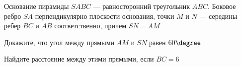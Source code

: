 \begin{ex}
	\begin{condition}
		Основание пирамиды \( SABC \) --- равносторонний треугольник \( ABC \). Боковое ребро \( SA \) перпендикулярно плоскости основания, точки \( M \) и \( N \) --- середины ребер \( BC \) и \( AB \) соответственно, причем \( SN=AM \)
		\begin{enumcols}[label=\asbuk*)]
			\item Докажите, что угол между прямыми \( AM \) и \( SN \) равен \( 60\degree \)
			\item Найдите расстояние между этими прямыми, если \( BC=6 \)
		\end{enumcols}
	\end{condition}
\end{ex}